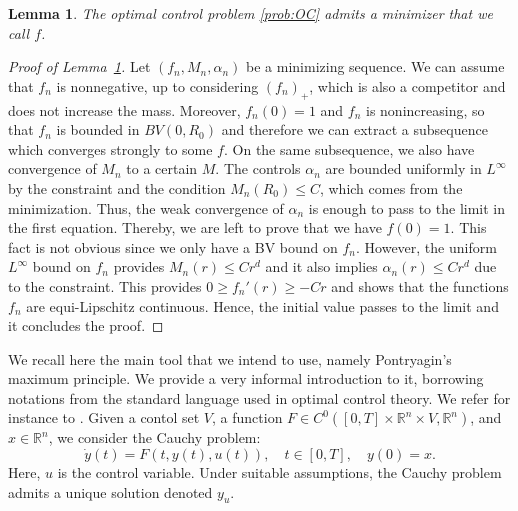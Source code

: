 \documentclass[11pt,a4paper]{article}
\numberwithin{equation}{section}
\theoremstyle{plain}
\newtheorem{lemma}[theorem]{Lemma}
\theoremstyle{remark}
\begin{document}
\begin{lemma}\label{lem:minimizer_P_tilde}
The optimal control problem \ref{prob:OC} admits a minimizer that we call $f$.    
\end{lemma}

\begin{proof}[Proof of Lemma~\ref{lem:minimizer_P_tilde}]
Let $(f_n,M_n,\alpha_n)$ be a minimizing sequence. We can assume that $f_n$ is nonnegative, up to considering $(f_n)_{+}$, which is also a competitor and does not increase the mass. Moreover, $f_n(0)=1$ and $f_n$ is nonincreasing, so that $f_n$ is bounded in $BV(0,R_0)$ and therefore we can extract a subsequence which converges strongly to some $f$. On the same subsequence, we also have convergence of $M_n$ to a certain $M$. The controls $\alpha_{n}$ are bounded uniformly in $L^{\infty}$ by the constraint and the condition $M_n(R_0)\leq C$, which comes from the minimization. Thus, the weak convergence of $\alpha_n$ is enough to pass to the limit in the first equation. Thereby, we are left to prove that we have $f(0)=1$. This fact is not obvious since we only have a BV bound on $f_n$. However, the uniform $L^\infty$ bound on $f_n$ provides $M_n(r)\leq Cr^d$ and it also implies $\alpha_n(r)\leq Cr^d$ due to the constraint. This provides $0\geq f_n'(r)\geq -Cr$ and shows that the functions $f_n$ are equi-Lipschitz continuous. Hence, the initial value passes to the limit and it concludes the proof.
\end{proof}


We recall here the main tool that we intend to use, namely Pontryagin's maximum principle. We provide a very informal introduction to it, borrowing notations from the standard language used in optimal control theory. We refer for instance to \cite{Pontryagin87, Macki_Strauss82}.  Given a contol set $V$, a function $F \in C^0([0,T] \times \mathbb{R}^n \times V, \mathbb{R}^n)$, and $x \in \mathbb{R}^n$, we consider the Cauchy problem:
\begin{equation}
\dot{y}(t) = F(t, y(t), u(t)), \quad t \in [0,T], \quad y(0) = x .
\end{equation}
Here, $u$ is the control variable. Under suitable assumptions, the Cauchy problem admits a unique solution denoted $y_u$.  
\end{document}
